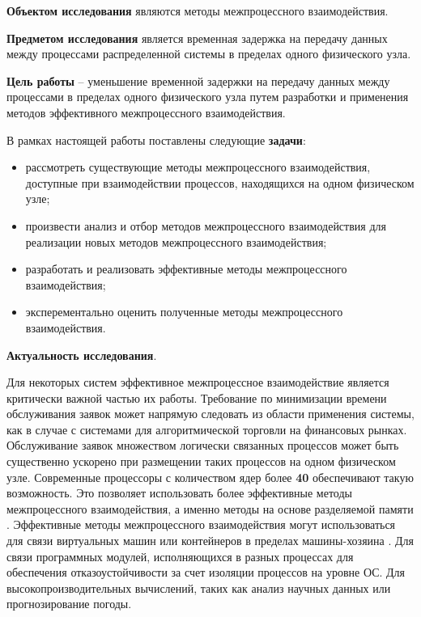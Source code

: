 \startprefacepage

\textbf{Объектом исследования} являются методы межпроцессного взаимодействия.

\textbf{Предметом исследования} является временная задержка на передачу данных между процессами распределенной системы в пределах одного физического узла.

\textbf{Цель работы} -- уменьшение временной задержки на передачу данных между процессами в пределах одного физического узла путем разработки и применения методов эффективного межпроцессного взаимодействия.

В рамках настоящей работы поставлены следующие \textbf{задачи}:

\begin{itemize}
\item рассмотреть существующие методы межпроцессного взаимодействия, доступные при взаимодействии процессов, находящихся на одном физическом узле;
\item произвести анализ и отбор методов межпроцессного взаимодействия для реализации новых методов межпроцессного взаимодействия;
\item разработать и реализовать эффективные методы межпроцессного взаимодействия;
\item эксперементально оценить полученные методы межпроцессного взаимодействия.
\end{itemize}

\textbf{Актуальность исследования}.

Для некоторых систем эффективное межпроцессное взаимодействие является критически важной частью их работы. Требование по минимизации времени обслуживания заявок может напрямую следовать из области применения системы, как в случае с системами для алгоритмической торговли на финансовых рынках. Обслуживание заявок множеством логически связанных процессов может быть существенно ускорено при размещении таких процессов на одном физическом узле. Современные процессоры с количеством ядер более \textbf{40} обеспечивают такую возможность.
Это позволяет использовать более эффективные методы межпроцессного взаимодействия, а именно методы на основе разделяемой памяти \cite{Smith2012DraftH}.
Эффективные методы межпроцессного взаимодействия могут использоваться для связи виртуальных машин или контейнеров в пределах машины-хозяина \cite{IPCInterVirtualMachineShmem, IPCInterVirtualMachineShmemOptimizations}.
Для связи программных модулей, исполняющихся в разных процессах для обеспечения отказоустойчивости за счет изоляции процессов на уровне ОС. 
Для высокопроизводительных вычислений, таких как анализ научных данных или прогнозирование погоды.

